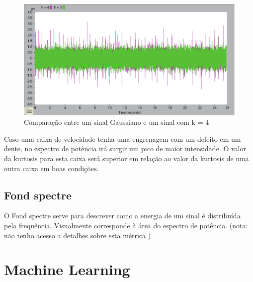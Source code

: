 
\begin{figure}[H]
\centering
\includegraphics[scale=0.3]{figs/Kurtosis1}
\caption{Comparação entre um sinal Gaussiano e um sinal com k = 4 }\label{kurtosis1}
\end{figure}

Caso uma caixa de velocidade tenha uma engrenagem com um defeito em um dente, no espectro de potência irá surgir um pico de maior intensidade. O valor da kurtosis para esta caixa será superior em relação ao valor da kurtosis de uma outra caixa em boas condições.





\subsection{Fond spectre}

O Fond spectre serve para descrever como  a energia de um sinal é distribuída pela frequência. Visualmente corresponde à área do espectro de potência. (nota: não tenho acesso a detalhes sobre esta métrica )




\section{Machine Learning}

